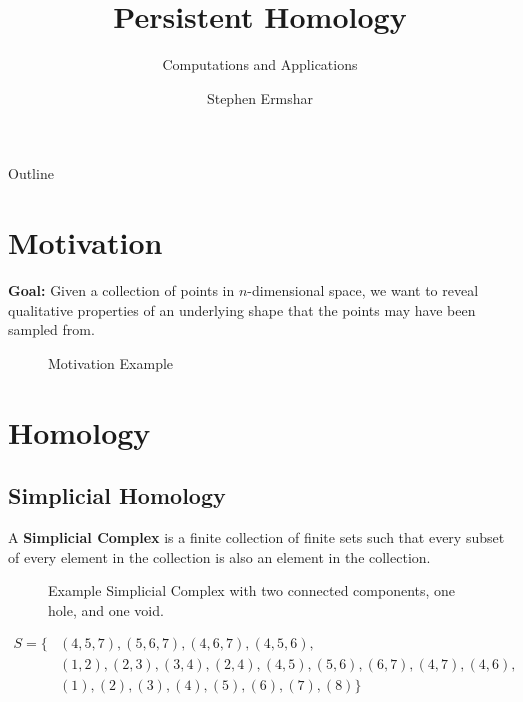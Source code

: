 

\title{Persistent Homology}
\subtitle{Computations and Applications}
\author{Stephen Ermshar}
\date{}






\begin{frame}
    \titlepage
\end{frame}

\begin{frame}{Outline}
	\tableofcontents
\end{frame}

\section[Motivation]{Motivation}
\begin{frame}
	\textbf{Goal:} Given a collection of points in \(n\)-dimensional space, we want to reveal qualitative properties of an underlying shape that the points may have been sampled from.

	\begin{figure}
		
		\caption{Motivation Example}
	\end{figure}
\end{frame}

\section[Homology]{Homology}
\subsection{Simplicial Homology}
\begin{frame}
	\begin{definition}
		A \textbf{Simplicial Complex} is a finite collection of finite sets such that every subset of every element in the collection is also an element in the collection. \cite{wagner}
	\end{definition}
	\begin{figure}
		
		\caption{Example Simplicial Complex with two connected components, one hole, and one void.}
	\end{figure}
	\begin{align*}
		S = \{&
			(4,5,7), (5,6,7), (4,6,7), (4,5,6),\\
			&(1,2), (2,3), (3,4), (2,4), (4,5), (5,6), (6,7), (4,7),
			(4,6),\\
			&(1), (2), (3), (4), (5), (6), (7), (8)
		\}
	\end{align*}
\end{frame}
